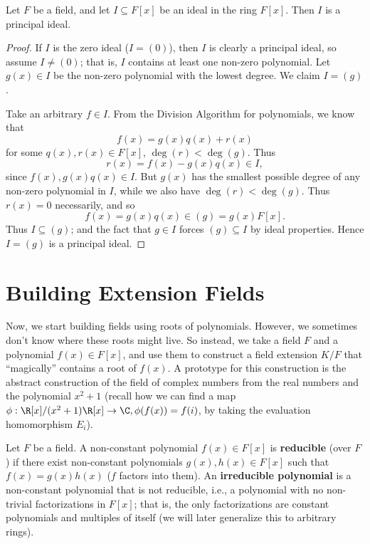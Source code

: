 \documentclass[math1530-lecture-notes]{subfiles}
\begin{document}
\begin{theorem}[]{}
  Let $F$ be a field, and let $I\subseteq F[x]$ be an ideal in the ring $F[x]$. Then $I$ is a
  principal ideal.
\end{theorem}
\begin{proof}[Proof]
  If $I$ is the zero ideal ($I=\left( 0 \right) $), then $I$ is clearly a principal ideal, so assume
  $I\neq (0)$; that is, $I$ contains at least one non-zero polynomial. Let $g(x)\in I$ be the non-zero
  polynomial with the lowest degree. We claim $I=(g)$.

  Take an arbitrary $f\in I$. From the Division Algorithm for polynomials, we know that \[
    f(x)=g(x)q(x)+r(x)
  \] for some $q(x),r(x)\in F[x]$, $\deg(r)<\deg(g)$. Thus \[
    r(x)=f(x)-g(x)q(x)\in I
  ,\] since $f(x),g(x)q(x)\in I$. But $g(x)$ has the smallest possible degree of any non-zero
  polynomial in $I$, while we also have $\deg(r)<\deg(g)$. Thus $r(x)=0$ necessarily, and so \[
    f(x)=g(x)q(x)\in (g)=g(x)F[x]
  .\] Thus $I\subseteq (g)$; and the fact that $g\in I$ forces $(g)\subseteq I$ by ideal properties.
  Hence $I=(g)$ is a principal ideal.
\end{proof}

\section{Building Extension Fields}

Now, we start building fields using roots of polynomials. However, we sometimes don't know where
these roots might live. So instead, we take a field $F$ and a polynomial $f(x)\in F[x]$, and use
them to construct a field extension $K / F$ that ``magically'' contains a root of $f(x)$. A
prototype for this construction is the abstract construction of the field of complex numbers from
the real numbers and the polynomial $x^2+1$ (recall how we can find a map $\phi:\R[x] /
(x^2+1)\R[x]\to \C, \phi(f(x))=f(i)$, by taking the evaluation homomorphism $E_i$).

\begin{definition}[Irreducibility]{}
  Let $F$ be a field. A non-constant polynomial $f(x)\in F[x]$ is \textbf{reducible} (over $F$) if
  there exist non-constant polynomials $g(x),h(x)\in F[x]$ such that $f(x)=g(x)h(x)$ ($f$ factors
  into them). An \textbf{irreducible polynomial} is a non-constant polynomial that is not reducible,
  i.e., a polynomial with no non-trivial factorizations in $F[x]$; that is, the only factorizations
  are constant polynomials and multiples of itself (we will later generalize this to arbitrary
  rings).
\end{definition}
\end{document}
